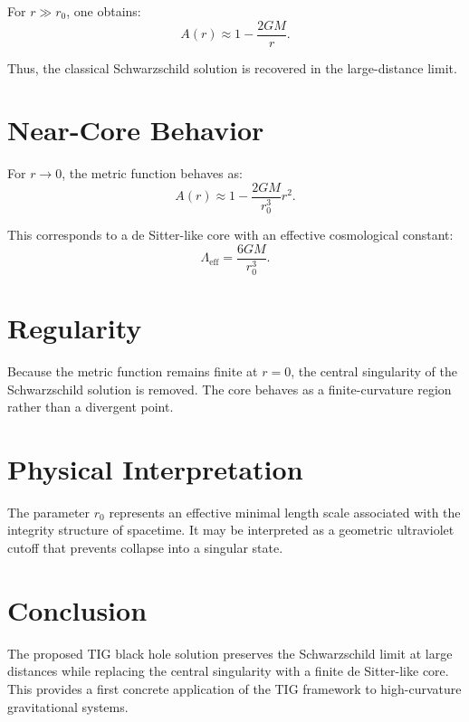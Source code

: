 \documentclass[11pt,a4paper]{article}
\begin{document}
For \( r \gg r_0 \), one obtains:
\begin{equation}
A(r) \approx 1 - \frac{2GM}{r}.
\end{equation}

Thus, the classical Schwarzschild solution is recovered in the large-distance limit.

\section{Near-Core Behavior}

For \( r \to 0 \), the metric function behaves as:
\begin{equation}
A(r) \approx 1 - \frac{2GM}{r_0^3} r^2 .
\end{equation}

This corresponds to a de Sitter-like core with an effective cosmological constant:
\begin{equation}
\Lambda_{\mathrm{eff}} = \frac{6GM}{r_0^3}.
\end{equation}

\section{Regularity}

Because the metric function remains finite at \( r = 0 \), the central singularity of the Schwarzschild solution is removed. The core behaves as a finite-curvature region rather than a divergent point.

\section{Physical Interpretation}

The parameter \( r_0 \) represents an effective minimal length scale associated with the integrity structure of spacetime. It may be interpreted as a geometric ultraviolet cutoff that prevents collapse into a singular state.

\section{Conclusion}

The proposed TIG black hole solution preserves the Schwarzschild limit at large distances while replacing the central singularity with a finite de Sitter-like core. This provides a first concrete application of the TIG framework to high-curvature gravitational systems.
\end{document}
